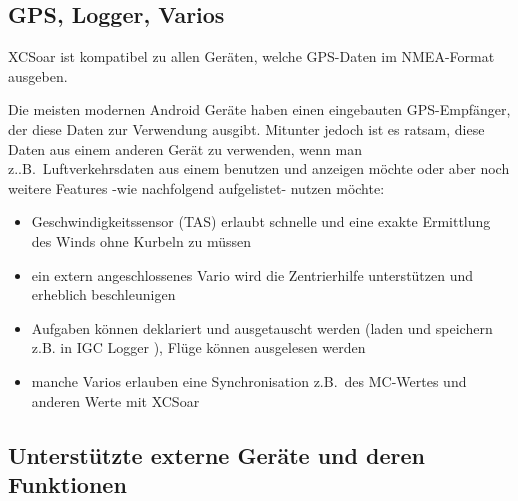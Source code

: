 \subsection*{GPS, Logger, Varios}

{\textsf  XCSoar}  ist kompatibel zu allen Geräten, welche GPS-Daten im NMEA-Format ausgeben.

Die meisten modernen Android Geräte haben einen eingebauten GPS-Empfänger, der diese Daten zur Verwendung 
ausgibt. Mitunter jedoch ist es ratsam, diese Daten aus einem anderen Gerät zu verwenden, wenn man z..B.\ Luftverkehrsdaten aus einem 
\fl benutzen und anzeigen möchte oder aber noch weitere Features -wie nachfolgend aufgelistet- nutzen möchte:



\begin{itemize}
\item Geschwindigkeitssensor (TAS) erlaubt schnelle und eine exakte Ermittlung des Winds ohne Kurbeln zu müssen
\item ein extern angeschlossenes Vario wird die Zentrierhilfe unterstützen und erheblich beschleunigen
\item Aufgaben können deklariert und ausgetauscht werden (laden und speichern z.B. in IGC Logger ),   Flüge können ausgelesen werden 
\item manche Varios erlauben eine Synchronisation z.B.\ des MC-Wertes und anderen Werte mit {\textsf  XCSoar} 
\end{itemize}

\subsection*{Unterstützte externe Geräte und deren Funktionen}\label{sec:supported-varios}

